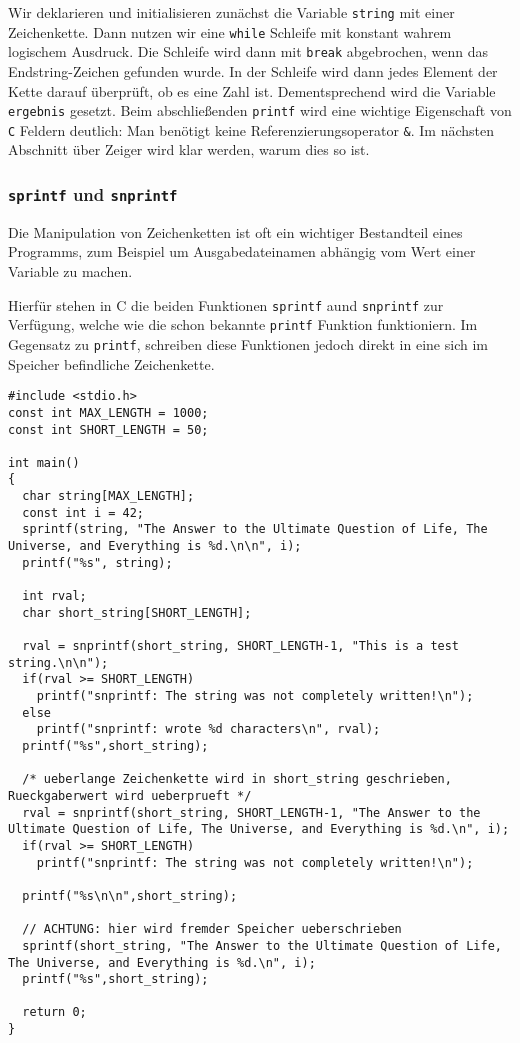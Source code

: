 Wir deklarieren und initialisieren zunächst die Variable \texttt{string} mit einer Zeichenkette.
Dann nutzen wir eine \verb|while| Schleife mit konstant wahrem logischem Ausdruck.
Die Schleife wird dann mit \verb|break| abgebrochen, wenn das Endstring-Zeichen gefunden wurde.
In der Schleife wird dann jedes Element der Kette darauf überprüft, ob es eine Zahl ist.
Dementsprechend wird die Variable \verb|ergebnis| gesetzt.
Beim abschließenden \texttt{printf} wird eine wichtige Eigenschaft von \texttt{C} Feldern deutlich:
Man benötigt keine Referenzierungsoperator \verb|&|.
Im nächsten Abschnitt über Zeiger wird klar werden, warum dies so ist.

\subsubsection{\texttt{sprintf} und \texttt{snprintf}}

Die Manipulation von Zeichenketten ist oft ein wichtiger Bestandteil eines Programms, zum Beispiel um Ausgabedateinamen abh\"{a}ngig vom Wert einer Variable zu machen.

Hierf\"{u}r stehen in C die beiden Funktionen \texttt{sprintf} aund \texttt{snprintf} zur Verf\"{u}gung, welche wie die schon bekannte \texttt{printf} Funktion funktioniern.
Im Gegensatz zu \texttt{printf}, schreiben diese Funktionen jedoch direkt in eine sich im Speicher befindliche Zeichenkette.

\begin{lstlisting}
#include <stdio.h>
const int MAX_LENGTH = 1000;
const int SHORT_LENGTH = 50;

int main()
{
  char string[MAX_LENGTH];
  const int i = 42;
  sprintf(string, "The Answer to the Ultimate Question of Life, The Universe, and Everything is %d.\n\n", i);
  printf("%s", string);
  
  int rval;
  char short_string[SHORT_LENGTH];
  
  rval = snprintf(short_string, SHORT_LENGTH-1, "This is a test string.\n\n");
  if(rval >= SHORT_LENGTH) 
    printf("snprintf: The string was not completely written!\n");
  else 
    printf("snprintf: wrote %d characters\n", rval);
  printf("%s",short_string);
  
  /* ueberlange Zeichenkette wird in short_string geschrieben, Rueckgaberwert wird ueberprueft */
  rval = snprintf(short_string, SHORT_LENGTH-1, "The Answer to the Ultimate Question of Life, The Universe, and Everything is %d.\n", i);
  if(rval >= SHORT_LENGTH) 
    printf("snprintf: The string was not completely written!\n");
  
  printf("%s\n\n",short_string);
  
  // ACHTUNG: hier wird fremder Speicher ueberschrieben 
  sprintf(short_string, "The Answer to the Ultimate Question of Life, The Universe, and Everything is %d.\n", i);
  printf("%s",short_string); 
  
  return 0;
}
\end{lstlisting}

